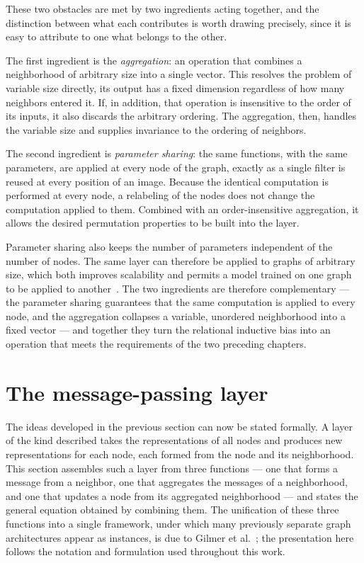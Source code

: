 These two obstacles are met by two ingredients acting together, and the
distinction between what each contributes is worth drawing precisely, since it
is easy to attribute to one what belongs to the other. 

The first ingredient is the \textit{aggregation}: an operation that combines a neighborhood of 
arbitrary size into a single vector. This resolves the problem of variable size directly, its
output has a fixed dimension regardless of how many neighbors entered it. If,
in addition, that operation is insensitive to the order of its inputs, it also
discards the arbitrary ordering. The aggregation, then, handles the variable size 
and supplies invariance to the ordering of neighbors.

The second ingredient is \textit{parameter sharing}: the same functions, with
the same parameters, are applied at every node of the graph, exactly as a
single filter is reused at every position of an image.
Because the identical computation is
performed at every node, a relabeling of the nodes does not change the computation
applied to them. Combined with an order-insensitive aggregation, it allows the
desired permutation properties to be built into the layer.

Parameter sharing also keeps the number of parameters independent of the number
of nodes. The same layer can therefore be applied to graphs of arbitrary size,
which both improves scalability and permits a model trained on one graph to be
applied to another~\cite{bishop2024}. The two ingredients are therefore
complementary --- the parameter sharing guarantees that the same computation
is applied to every node, and the aggregation collapses a variable, unordered
neighborhood into a fixed vector --- and together they turn the relational inductive
bias into an operation that meets the requirements of the two preceding
chapters.

\section{The message-passing layer}
\label{sec:message-passing-layer}

The ideas developed in the previous section can now be stated formally. A layer of
the kind described takes the representations of all nodes and produces new
representations for each node, each formed from the node and its neighborhood.
This section assembles such a layer from three functions --- one that forms a
message from a neighbor, one that aggregates the messages of a neighborhood,
and one that updates a node from its aggregated neighborhood --- and states the
general equation obtained by combining them. The unification of these three functions
into a single framework, under which many previously separate graph architectures
appear as instances, is due to Gilmer et al.~\cite{gilmer2017}; the presentation
here follows the notation and formulation used throughout this work.

